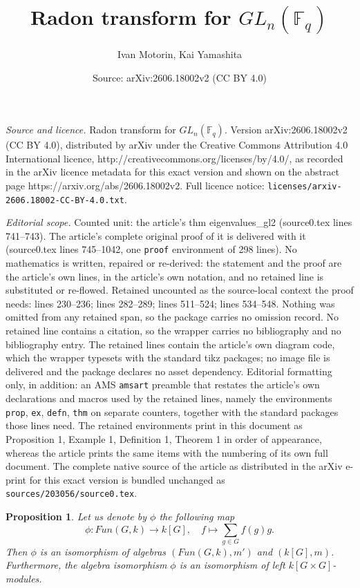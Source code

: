 \documentclass[10pt,a4paper]{amsart}
\title{Radon transform for $GL_n(\mathbb{F}_q)$}
\author{Ivan Motorin, Kai Yamashita}
\date{Source: arXiv:2606.18002v2 (CC BY 4.0)}
\newtheorem{prop}{Proposition}
\begin{document}
\maketitle

\noindent\emph{Source and licence.} Radon transform for $GL_n(\mathbb{F}_q)$. Version arXiv:2606.18002v2 (CC BY 4.0), distributed by arXiv under the Creative Commons Attribution 4.0 International licence, http://creativecommons.org/licenses/by/4.0/, as recorded in the arXiv licence metadata for this exact version and shown on the abstract page https://arxiv.org/abs/2606.18002v2. Full licence notice: \texttt{licenses/arxiv-2606.18002-CC-BY-4.0.txt}.\par\smallskip

\noindent\textit{Editorial scope.} Counted unit: the article's thm eigenvalues\_gl2 (source0.tex lines 741--743). The article's complete original proof of it is delivered with it (source0.tex lines 745--1042, one \texttt{proof} environment of 298 lines). No mathematics is written, repaired or re-derived: the statement and the proof are the article's own lines, in the article's own notation, and no retained line is substituted or re-flowed.  Retained uncounted as the source-local context the proof needs: lines 230--236; lines 282--289; lines 511--524; lines 534--548.  Nothing was omitted from any retained span, so the package carries no omission record.  No retained line contains a citation, so the wrapper carries no bibliography and no bibliography entry.  The retained lines contain the article's own diagram code, which the wrapper typesets with the standard tikz packages; no image file is delivered and the package declares no asset dependency.  Editorial formatting only, in addition: an AMS \texttt{amsart} preamble that restates the article's own declarations and macros used by the retained lines, namely the environments \texttt{prop}, \texttt{ex}, \texttt{defn}, \texttt{thm} on separate counters, together with the standard packages those lines need.  The retained environments print in this document as Proposition 1, Example 1, Definition 1, Theorem 1 in order of appearance, whereas the article prints the same items with the numbering of its own full document.  The complete native source of the article as distributed in the arXiv e-print for this exact version is bundled unchanged as \texttt{sources/203056/source0.tex}.
\begin{prop}\label{Functions-group_algebra_correspondence}
    Let us denote by $\phi$ the following map
    \begin{equation}\label{fun_iso}
        \phi: Fun(G,k) \rightarrow k[G], \quad f \mapsto \sum_{g\in G} f(g) g.
    \end{equation}
    Then $\phi$ is an isomorphism of algebras $(Fun(G,k),m')$ and $(k[G],m)$. Furthermore, the algebra isomorphism $\phi$ is an isomorphism of left $k[G \times G]$-modules.
\end{prop}
\end{document}
